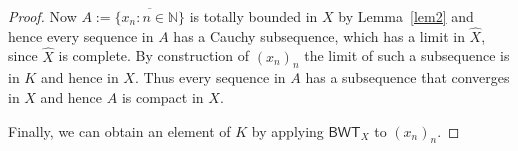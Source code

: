 \documentclass[a4paper]{amsart}
\def\IN{{\mathbb{N}}}
\theoremstyle{definition}
\begin{document}
\begin{proof}
Now $A:=\overline{\{x_n:n\in\IN\}}$ is totally bounded in $X$ by Lemma~\ref{lem2} and hence every sequence in $A$ has a Cauchy subsequence,
which has a limit in $\hat{X}$, since $\hat{X}$ is complete. By construction of $(x_n)_n$ the limit of such a subsequence is in $K$ and hence in $X$.
Thus every sequence in $A$ has a subsequence that converges in $X$ and hence $A$ is compact in $X$.
%

Finally, we can obtain an element of $K$ by applying $\mathsf{BWT}_{X}$ to $(x_n)_n$.
\end{proof}








%
\end{document}
